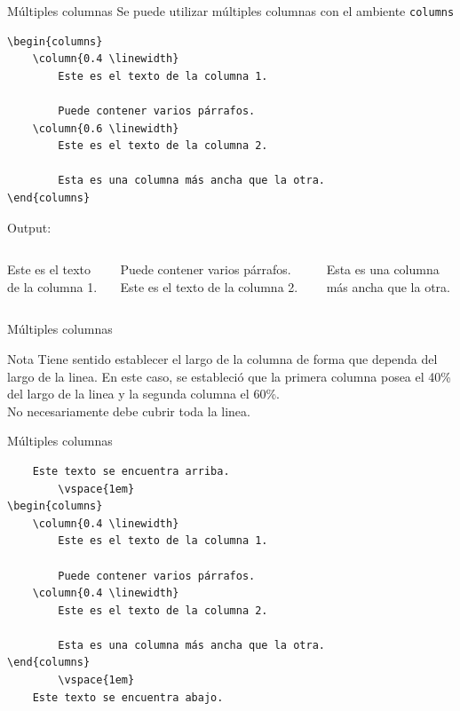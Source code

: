 \documentclass[../slides.tex]{subfiles}
\begin{document}
    \begin{frame}[fragile]{Múltiples columnas}
        Se puede utilizar múltiples columnas con el ambiente \texttt{columns}
        \begin{verbatim}
\begin{columns}
    \column{0.4 \linewidth}
        Este es el texto de la columna 1.
            
        Puede contener varios párrafos.
    \column{0.6 \linewidth}
        Este es el texto de la columna 2.
            
        Esta es una columna más ancha que la otra.
\end{columns}
        \end{verbatim}
    Output:
    
        \begin{columns}
                Este es el texto de la columna 1.

                Puede contener varios párrafos.
                Este es el texto de la columna 2.

                Esta es una columna más ancha que la otra.
        \end{columns}
     \end{frame}

     \begin{frame}{Múltiples columnas}
        \begin{block}{Nota}
            Tiene sentido establecer el largo de la columna de forma que dependa del largo de la linea. En este caso, se estableció que la primera columna posea el 40\% del largo de la linea y la segunda columna el 60\%.\\[\baselineskip]
            
            No necesariamente debe cubrir toda la linea.
        \end{block}
     \end{frame}
     
     \begin{frame}[fragile]{Múltiples columnas}
        \begin{verbatim}
    Este texto se encuentra arriba.
        \vspace{1em}
\begin{columns}
    \column{0.4 \linewidth}
        Este es el texto de la columna 1.
            
        Puede contener varios párrafos.
    \column{0.4 \linewidth}
        Este es el texto de la columna 2.
            
        Esta es una columna más ancha que la otra.
\end{columns}
        \vspace{1em}
    Este texto se encuentra abajo.
        \end{verbatim}
     \end{frame}
     
\end{document}
